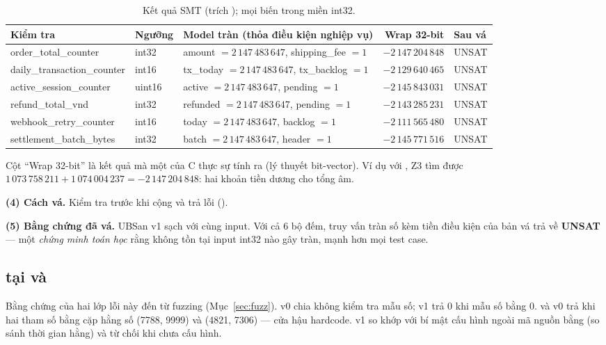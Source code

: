 \begin{table}[H]
\centering\small
\caption{Kết quả SMT (trích ); mọi biến trong miền int32.}
\label{tab:smt}
\begin{tabularx}{\linewidth}{@{}l l X r l@{}}
\toprule
Kiểm tra & Ngưỡng & Model tràn (thỏa điều kiện nghiệp vụ) & Wrap 32-bit & Sau vá \\
\midrule
order\_total\_counter & int32 & amount $=2\,147\,483\,647$, shipping\_fee $=1$ & $-2\,147\,204\,848$ & UNSAT \\
daily\_transaction\_counter & int16 & tx\_today $=2\,147\,483\,647$, tx\_backlog $=1$ & $-2\,129\,640\,465$ & UNSAT \\
active\_session\_counter & uint16 & active $=2\,147\,483\,647$, pending $=1$ & $-2\,145\,843\,031$ & UNSAT \\
refund\_total\_vnd & int32 & refunded $=2\,147\,483\,647$, pending $=1$ & $-2\,143\,285\,231$ & UNSAT \\
webhook\_retry\_counter & int16 & today $=2\,147\,483\,647$, backlog $=1$ & $-2\,111\,565\,480$ & UNSAT \\
settlement\_batch\_bytes & int32 & batch $=2\,147\,483\,647$, header $=1$ & $-2\,145\,771\,516$ & UNSAT \\
\bottomrule
\end{tabularx}
\end{table}
Cột ``Wrap 32-bit'' là kết quả mà một  của C thực sự tính ra (lý thuyết bit-vector). Ví
dụ với , Z3 tìm được
$1\,073\,758\,211 + 1\,074\,004\,237 = -2\,147\,204\,848$: hai khoản tiền dương cho tổng âm.

\textbf{(4) Cách vá.} Kiểm tra 
trước khi cộng và trả lỗi ().

\textbf{(5) Bằng chứng đã vá.} UBSan v1 sạch với cùng input. Với cả 6 bộ đếm, truy vấn tràn số
kèm tiền điều kiện của bản vá trả về \textbf{UNSAT} — một \emph{chứng minh toán học} rằng không
tồn tại input int32 nào gây tràn, mạnh hơn mọi test case.

\subsection{ tại  và }
Bằng chứng của hai lớp lỗi này đến từ fuzzing (Mục~\ref{sec:fuzz}).  v0 chia
 không kiểm tra mẫu số; v1 trả 0 khi mẫu số bằng 0.
 và  v0 trả  khi hai tham số
bằng cặp hằng số (7788, 9999) và (4821, 7306) — cửa hậu hardcode. v1 so khớp với bí mật cấu hình
ngoài mã nguồn bằng  (so sánh thời gian hằng) và từ chối khi chưa cấu
hình.

